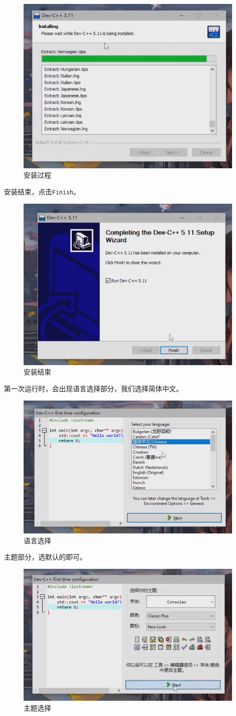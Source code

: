 \begin{figure}[H]
\centering
\includegraphics[width=0.6\linewidth]{01chapter/img/dev安装06}
\caption{安装过程}
\label{fig:dev06}
\end{figure}
安装结束，点击\texttt{Finish}。
\begin{figure}[H]
\centering
\includegraphics[width=0.6\linewidth]{01chapter/img/dev安装07}
\caption{安装结束}
\label{fig:dev07}
\end{figure}
第一次运行时，会出现语言选择部分，我们选择简体中文。
\begin{figure}[H]
\centering
\includegraphics[width=0.6\linewidth]{01chapter/img/dev安装08}
\caption{语言选择}
\label{fig:dev08}
\end{figure}
主题部分，选默认的即可。
\begin{figure}[H]
\centering
\includegraphics[width=0.6\linewidth]{01chapter/img/dev安装09}
\caption{主题选择}
\label{fig:dev09}
\end{figure}
